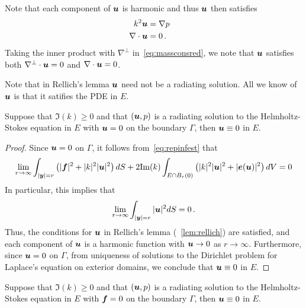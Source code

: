 \begin{remark} \label{rmk:harmu}
Note that each component of ${\boldsymbol u}$ is harmonic and thus ${\boldsymbol u}$ then satisfies
\begin{align}
k^2 {\boldsymbol u} &= \nabla p  \quad \label{eq:massconsred} \\
\nabla \cdot {\boldsymbol u} &= 0 \, .
\end{align}
Taking the inner product with $\nabla^{\perp}$ in~\cref{eq:massconsred}, 
we note that ${\boldsymbol u}$ satisfies both $\nabla^{\perp} \cdot {\boldsymbol u} = 0$ 
and $\nabla \cdot {\boldsymbol u} = 0$.
\end{remark}
\begin{remark}
Note that in Rellich's lemma ${\boldsymbol u}$ need not be a radiating solution. 
All we know of ${\boldsymbol u}$ is that it satifies the PDE in $E$.
\end{remark}

\begin{thrm}
Suppose that $\Im(k)\geq 0$ and 
that $({\boldsymbol u},p)$ is a radiating solution to the Helmholtz-Stokes
equation in $E$ with ${\boldsymbol u} =0$ on the boundary $\Gamma$, then
${\boldsymbol u} \equiv 0$ in $E$.
\end{thrm}

\begin{proof}
Since ${\boldsymbol u} = 0$ on $\Gamma$, it follows from~\cref{eq:repinfest} that
\begin{equation}
\lim_{r\to\infty}
\int_{|{\boldsymbol y}|=r} \left( |{\boldsymbol f}|^2 + |k|^2 |{\boldsymbol u}|^2 \right) dS +
2 {\textrm{\textup{Im}}}(k) \int_{E \cap B_{r}(0)} \left(|k|^2 |{\boldsymbol u}|^2 + |{\boldsymbol e}({\boldsymbol u})|^2 \right)
dV = 0
\end{equation} 
In particular, this implies that
\begin{equation}
\lim_{r\to\infty} \int_{|{\boldsymbol y}|=r} |{\boldsymbol u}|^2 dS = 0 \, .
\end{equation}
Thus, the conditions for ${\boldsymbol u}$ in Rellich's lemma (~\cref{lem:rellich})
are satisfied, and each component of ${\boldsymbol u}$ is a harmonic function
with ${\boldsymbol u} \to 0$ as $r \to \infty$. Furthermore, since ${\boldsymbol u}=0$ on
$\Gamma$, from uniqueness of solutions to the
Dirichlet problem for Laplace's equation
on exterior domains, we conclude that ${\boldsymbol u} \equiv 0$ in $E$.
\end{proof}

\begin{thrm}
Suppose that $\Im(k)\geq 0$ and 
that $({\boldsymbol u},p)$ is a radiating solution to the Helmholtz-Stokes
equation in $E$ with ${\boldsymbol f} = 0$ on the boundary $\Gamma$, then
${\boldsymbol u} \equiv 0$ in $E$.
\end{thrm}

